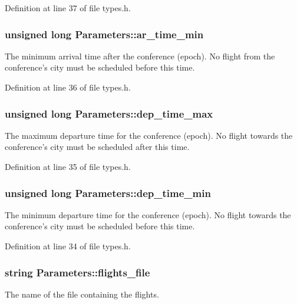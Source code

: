 Definition at line 37 of file types.\-h.

\hypertarget{struct_parameters_acb0d745687908cfb5f09684adc7c63c3}{
\subsubsection[{ar\-\_\-time\-\_\-min}]{\setlength{\rightskip}{0pt plus 5cm}unsigned long Parameters\-::ar\-\_\-time\-\_\-min}}\label{struct_parameters_acb0d745687908cfb5f09684adc7c63c3}
The minimum arrival time after the conference (epoch). No flight from the conference's city must be scheduled before this time. 

Definition at line 36 of file types.\-h.

\hypertarget{struct_parameters_a29fbab0336259cdd94699051db902096}{
\subsubsection[{dep\-\_\-time\-\_\-max}]{\setlength{\rightskip}{0pt plus 5cm}unsigned long Parameters\-::dep\-\_\-time\-\_\-max}}\label{struct_parameters_a29fbab0336259cdd94699051db902096}
The maximum departure time for the conference (epoch). No flight towards the conference's city must be scheduled after this time. 

Definition at line 35 of file types.\-h.

\hypertarget{struct_parameters_aa36f6191b750b3efd7f9b1920f00f37c}{
\subsubsection[{dep\-\_\-time\-\_\-min}]{\setlength{\rightskip}{0pt plus 5cm}unsigned long Parameters\-::dep\-\_\-time\-\_\-min}}\label{struct_parameters_aa36f6191b750b3efd7f9b1920f00f37c}
The minimum departure time for the conference (epoch). No flight towards the conference's city must be scheduled before this time. 

Definition at line 34 of file types.\-h.

\hypertarget{struct_parameters_a5c748d49ace4e05373034e0e873ad2e7}{
\subsubsection[{flights\-\_\-file}]{\setlength{\rightskip}{0pt plus 5cm}string Parameters\-::flights\-\_\-file}}\label{struct_parameters_a5c748d49ace4e05373034e0e873ad2e7}
The name of the file containing the flights. 

